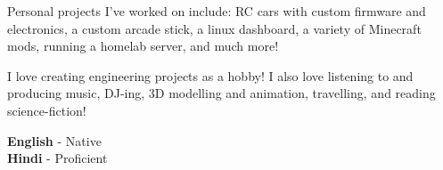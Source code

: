 \documentclass[9pt]{developercv} %
\begin{document}
\vspace{1em}



\vspace{4em}

\begin{minipage}[t]{0.3\textwidth}
	\vspace{-\baselineskip} %


	Personal projects I've worked on include: RC cars with custom firmware and electronics, a custom arcade stick, a linux dashboard, a variety of Minecraft mods, running a homelab server, and much more!
\end{minipage}
\hfill
\begin{minipage}[t]{0.3\textwidth}
	\vspace{-\baselineskip} %


	I love creating engineering projects as a hobby!
	I also love listening to and producing music, DJ-ing, 3D modelling and animation, travelling, and reading science-fiction!
\end{minipage}
\hfill
\begin{minipage}[t]{0.3\textwidth}
	\vspace{-\baselineskip} %


	\textbf{English} - Native \\
	\textbf{Hindi} - Proficient \\
\end{minipage}

\pagebreak
{}
\end{document}
